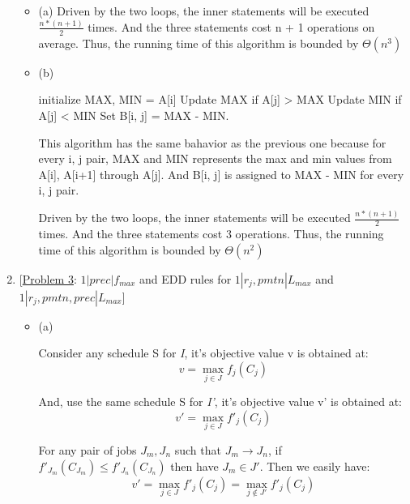 \documentclass[12pt]{article}
\begin{document}
\begin{enumerate}
\begin{itemize}
\item{(a)}
Driven by the two loops, the inner statements will be executed $\frac{n * (n + 1)}{2}$ times. And the three statements cost n + 1 operations on average. Thus, the running time of this algorithm is bounded by $\Theta(n^{3})$

\item{(b)}
\begin{algorithmic}
    \State initialize MAX, MIN = A[i]
        \State Update MAX if A[j] > MAX
        \State Update MIN if A[j] < MIN
        \State Set B[i, j] = MAX - MIN.
    \EndFor
\EndFor
\end{algorithmic}
This algorithm has the same bahavior as the previous one because for every i, j pair, MAX and MIN represents the max and min values from A[i], A[i+1] through A[j]. And B[i, j] is assigned to MAX - MIN for every i, j pair.

Driven by the two loops, the inner statements will be executed $\frac{n * (n + 1)}{2}$ times. And the three statements cost 3 operations. Thus, the running time of this algorithm is bounded by $\Theta(n^{2})$


\end{itemize}

\medskip

\item{} [\underline{Problem 3}: $1|prec|f_{max}$ and EDD rules for $1|r_{j}, pmtn|L_{max}$ and $1|r_{j}, pmtn, prec|L_{max}$]

\begin{itemize}
\item{(a)}

Consider any schedule S for {\it I}, it's objective value v is obtained at:
\begin{equation}
v = \max\limits_{j \in J} {f_{j}(C_{j})}
\end{equation}

And, use the same schedule S for {\it I'}, it's objective value v' is obtained at:
\begin{equation}
v' = \max\limits_{j \in J} {f'_{j}(C_{j})}
\end{equation}

For any pair of jobs $J_{m}, J_{n}$ such that $J_{m} \to J_{n}$, if $f'_{J_{m}}(C_{J_{m}}) \leq f'_{J_{n}}(C_{J_{n}})$ then have $J_{m} \in J'$. Then we easily have:
\begin{equation}
v' = \max\limits_{j \in J} {f'_{j}(C_{j})} = \max\limits_{j \not\in J'} {f'_{j}(C_{j})}
\end{equation}


\end{itemize}
\end{enumerate}
\end{document}
